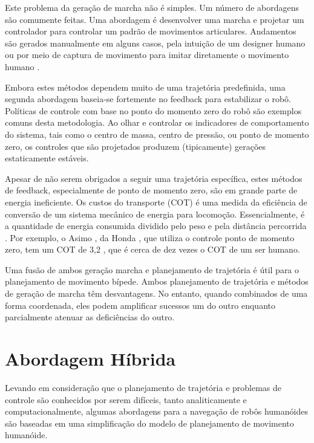 Este problema da geração de marcha não é simples. Um número de abordagens são comumente feitas. Uma abordagem é desenvolver uma marcha
e projetar um controlador para controlar um padrão de movimentos articulares. Andamentos são gerados manualmente em alguns casos, pela
intuição de um designer humano ou por meio de captura de movimento para imitar diretamente o movimento humano \cite{bchoi}. 

Embora estes métodos dependem muito de uma trajetória predefinida, uma segunda abordagem baseia-se fortemente no feedback para 
estabilizar o robô. Políticas de controle com base no ponto do momento zero  do robô \cite{pkajita} \cite{pnagasaka} são exemplos comuns 
desta metodologia. Ao olhar e controlar os indicadores de comportamento do sistema, tais como o centro de massa, centro de pressão, 
ou ponto de momento zero, os controles que são projetados produzem (tipicamente) gerações estaticamente estáveis.

Apesar de não serem obrigados a seguir uma trajetória específica, estes métodos de feedback, especialmente de ponto de momento zero,
são em grande parte de energia ineficiente. Os custos do transporte (COT) é uma medida da eficiência de conversão de um sistema 
mecânico de energia para locomoção. Essencialmente, é a quantidade de energia consumida dividido pelo peso e pela distância percorrida
\cite{bkuo}. Por exemplo, o Asimo , da Honda , que utiliza o controle ponto de momento zero, tem um COT de 3,2 , que é 
cerca de dez vezes o COT de um ser humano.

Uma fusão de ambos geração marcha e planejamento de trajetória é útil para o planejamento de movimento bípede. Ambos planejamento de 
trajetória e métodos de geração de marcha têm desvantagens. No entanto, quando combinados de uma forma coordenada, eles podem amplificar 
sucessos um do outro enquanto parcialmente atenuar as deficiências do outro.

\section{Abordagem H\'ibrida}
Levando em considera\c{c}\~ao que o planejamento de trajet\'oria e problemas de controle s\~ao conhecidos por serem dif\'iceis, 
tanto analiticamente e computacionalmente, algumas abordagens para a navega\c{c}\~ao de rob\^os human\'oides s\~ao baseadas em 
uma simplifica\c{c}\~ao do modelo de planejamento de movimento human\'oide.


